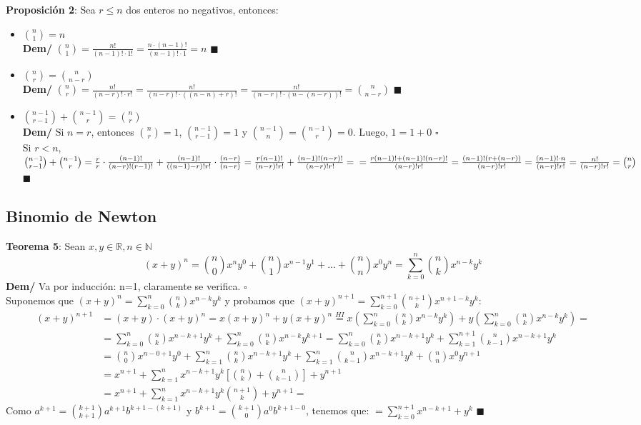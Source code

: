 \documentclass[11pt,a4paper]{article}
\newcommand*{\QEDA}{\null\nobreak\hfill\ensuremath{\blacksquare}}
\newcommand*{\QEDB}{\null\nobreak\hfill\ensuremath{\square}}
\begin{document}
\noindent \textbf{Proposici\'on 2}: Sea $r \leq n$ dos enteros no negativos, entonces:
\begin{itemize}
\item {\Large ${n \choose 1} = n$}\\
\textbf{Dem/} ${n \choose 1} = \frac{n!}{(n-1)!\cdot1!} = \frac{n \cdot (n-1)!}{(n-1)!\cdot 1} = n$ \QEDA
\item {\Large ${n \choose r} = {n \choose n-r}$}\\
\textbf{Dem/} ${n \choose r} = \frac{n!}{(n-r)!\cdot r!} = \frac{n!}{(n-r)!\cdot ((n-n)+r)!} = \frac{n!}{(n-r)!\cdot (n-(n-r))!} = {n \choose n-r} $ \QEDA
\item {\Large ${n-1 \choose r-1} + {n-1 \choose r} = {n \choose r}$}\\
\textbf{Dem/} Si $n=r$, entonces ${n \choose r}=1$, ${n-1 \choose r-1} = 1$ y ${n-1 \choose n} = {n-1 \choose r} = 0$. Luego, $1 = 1 + 0$ \QEDB\\
Si $r < n$, ${n-1 \choose r-1} + {n-1 \choose r} = \frac{r}{r} \cdot \frac{(n-1)!}{(n-r)!(r-1)!} + \frac{(n-1)!}{((n-1)-r)!r!} \cdot \frac{(n-r)}{(n-r)} = \frac{r(n-1)!}{(n-r)!r!} + \frac{(n-1)!(n-r)!}{(n-r)!r!} = \\ = \frac{r(n-1)!+(n-1)!(n-r)!}{(n-r)!r!} = \frac{(n-1)!(r+(n-r))}{(n-r)!r!} = \frac{(n-1)! \cdot n}{(n-r)!r!} = \frac{n!}{(n-r)!r!} = {n \choose r}$ \QEDA\\
\end{itemize}

\subsection{Binomio de Newton}
\noindent \textbf{Teorema 5}: Sean $x,y \in \mathbb{R}, n \in \mathbb{N}$
$$(x+y)^n = {n \choose 0}x^ny^0 + {n \choose 1}x^{n-1}y^1 + ... + {n \choose n}x^0y^n = \sum_{k=0}^n {n \choose k} x^{n-k}y^k$$
\textbf{Dem/} Va por inducci\'on: n=1, claramente se verifica. \QEDB\\
Suponemos que $(x+y)^n = \sum_{k=0}^n {n \choose k} x^{n-k}y^k$ y probamos que $(x+y)^{n+1} = \sum_{k=0}^{n+1} {n+1 \choose k} x^{n+1-k}y^k$:
\begin{align*}
(x+y)^{n+1} &= (x+y) \cdot (x+y)^n = x(x+y)^n + y(x+y)^n \overset{HI}{=} x(\sum_{k=0}^n {n \choose k} x^{n-k}y^k) + y(\sum_{k=0}^n {n \choose k} x^{n-k}y^k) =\\
& = \sum_{k=0}^n {n \choose k} x^{n-k+1}y^k + \sum_{k=0}^n {n \choose k} x^{n-k}y^{k+1}
= \sum_{k=0}^n {n \choose k} x^{n-k+1}y^k + \sum_{k=1}^{n+1} {n \choose k-1} x^{n-k+1}y^{k} \\
&= {n \choose 0} x^{n-0+1}y^0 + \sum_{k=1}^n {n \choose k} x^{n-k+1}y^k + \sum_{k=1}^{n} {n \choose k-1} x^{n-k+1}y^{k} + {n \choose n} x^0y^{n+1} \\
&= x^{n+1} + \sum_{k=1}^n x^{n-k+1}y^k\left[{n \choose k}  + {n \choose k-1}\right] + y^{n+1}\\
&= x^{n+1} + \sum_{k=1}^n x^{n-k+1}y^k{n+1 \choose k} + y^{n+1}=
\end{align*}
Como $\displaystyle{a^{k+1} = {k+1 \choose k+1} a^{k+1} b^{k+1-(k+1)}}$ y $\displaystyle{b^{k+1} = {k+1 \choose 0} a^0 b^{k+1-0}}$, tenemos que:
$\displaystyle{= \sum_{k=0}^{n+1} x^{n-k+1}+y^k}$ \QEDA
\end{document}
